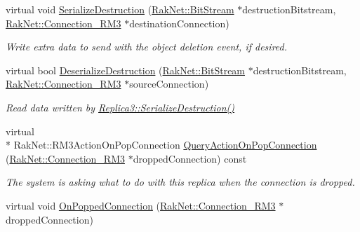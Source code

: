 \begin{DoxyCompactItemize}
\item 
virtual void \hyperlink{class_rak_net_1_1_replica3_composite_ac02df3fd25db390ebaed1bb0773a5086}{Serialize\-Destruction} (\hyperlink{class_rak_net_1_1_bit_stream}{Rak\-Net\-::\-Bit\-Stream} $\ast$destruction\-Bitstream, \hyperlink{class_rak_net_1_1_connection___r_m3}{Rak\-Net\-::\-Connection\-\_\-\-R\-M3} $\ast$destination\-Connection)
\begin{DoxyCompactList}\small\item\em Write extra data to send with the object deletion event, if desired. \end{DoxyCompactList}\item 
virtual bool \hyperlink{class_rak_net_1_1_replica3_composite_a16992d92f94580265ae4bba1a199b5ab}{Deserialize\-Destruction} (\hyperlink{class_rak_net_1_1_bit_stream}{Rak\-Net\-::\-Bit\-Stream} $\ast$destruction\-Bitstream, \hyperlink{class_rak_net_1_1_connection___r_m3}{Rak\-Net\-::\-Connection\-\_\-\-R\-M3} $\ast$source\-Connection)
\begin{DoxyCompactList}\small\item\em Read data written by \hyperlink{class_rak_net_1_1_replica3_ac78ab07796290ede00559de9d4ceb72d}{Replica3\-::\-Serialize\-Destruction()} \end{DoxyCompactList}\item 
virtual \\*
Rak\-Net\-::\-R\-M3\-Action\-On\-Pop\-Connection \hyperlink{class_rak_net_1_1_replica3_composite_a72b9991e5a7042055cd570f4f6988aa9}{Query\-Action\-On\-Pop\-Connection} (\hyperlink{class_rak_net_1_1_connection___r_m3}{Rak\-Net\-::\-Connection\-\_\-\-R\-M3} $\ast$dropped\-Connection) const 
\begin{DoxyCompactList}\small\item\em The system is asking what to do with this replica when the connection is dropped. \end{DoxyCompactList}\item 
\hypertarget{class_rak_net_1_1_replica3_composite_a0764cb0e3ca3120f062d5ac85ce80fb9}{virtual void \hyperlink{class_rak_net_1_1_replica3_composite_a0764cb0e3ca3120f062d5ac85ce80fb9}{On\-Popped\-Connection} (\hyperlink{class_rak_net_1_1_connection___r_m3}{Rak\-Net\-::\-Connection\-\_\-\-R\-M3} $\ast$dropped\-Connection)}\label{class_rak_net_1_1_replica3_composite_a0764cb0e3ca3120f062d5ac85ce80fb9}


\end{DoxyCompactItemize}
